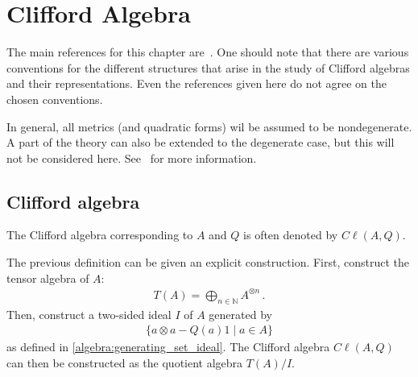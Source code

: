 \chapter{Clifford Algebra}\label{chapter:clifford}

    The main references for this chapter are~\citet{gallier_clifford_2008,choquet-bruhat_analysis_1991,choquet-bruhat_analysis_2000}. One should note that there are various conventions for the different structures that arise in the study of Clifford algebras and their representations. Even the references given here do not agree on the chosen conventions.

    In general, all metrics (and quadratic forms) wil be assumed to be nondegenerate. A part of the theory can also be extended to the degenerate case, but this will not be considered here. See~\citet{gallier_clifford_2008} for more information.

    \minitoc

\section{Clifford algebra}

    \begin{notation}
        The Clifford algebra corresponding to $A$ and $Q$ is often denoted by $C\ell(A,Q)$.
    \end{notation}

    \begin{construct}
        The previous definition can be given an explicit construction. First, construct the tensor algebra of $A$:
        \begin{gather}
            T(A) = \bigoplus_{n\in\mathbb{N}}A^{\otimes n}\,.
        \end{gather}
        Then, construct a two-sided ideal $I$ of $A$ generated by
        \begin{gather}
            \{a\otimes a - Q(a)1\mid a\in A\}
        \end{gather}
        as defined in \cref{algebra:generating_set_ideal}. The Clifford algebra $C\ell(A,Q)$ can then be constructed as the quotient algebra $T(A)/I$.
    \end{construct}

